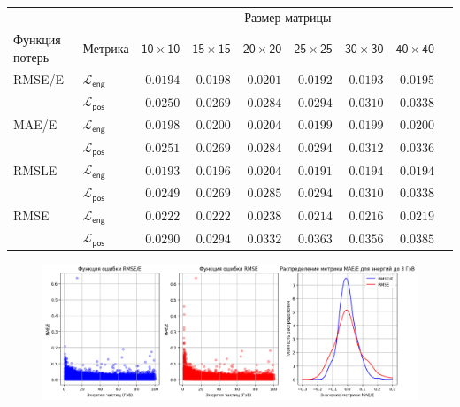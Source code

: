 \documentclass[a4paper,12pt]{extarticle}
\begin{document}
\begin{table}[ht]
	\footnotesize
	\centering
	\begin{tabular}{llrrrrrrr}
		\toprule
		{} & {} & \multicolumn{6}{c}{\textsf{Размер матрицы}} \\
		\cmidrule(lr){3-8}
		\textsf{Функция потерь} & \textsf{Метрика} & $\mathsf{10 \times 10}$ &  $\mathsf{15 \times 15}$ &  $\mathsf{20 \times 20}$ &  $\mathsf{25 \times 25}$ &  $\mathsf{30 \times 30}$ &  $\mathsf{40 \times 40}$ \\
		\midrule
        \textsf{RMSE/E} & $\mathcal{L}_{\mathsf{eng}}$ & $\mathsf{0.0194}$ & $\mathsf{0.0198}$ & $\mathsf{0.0201}$ & $\mathsf{0.0192}$ & $\mathsf{0.0193}$ & $\mathsf{0.0195}$ \\
        {} & $\mathcal{L}_{\mathsf{pos}}$ & $\mathsf{0.0250}$ & $\mathsf{0.0269}$ & $\mathsf{0.0284}$ & $\mathsf{0.0294}$ & $\mathsf{0.0310}$ & $\mathsf{0.0338}$ \\
        \midrule
        \textsf{MAE/E} & $\mathcal{L}_{\mathsf{eng}}$ & $\mathsf{0.0198}$ & $\mathsf{0.0200}$ & $\mathsf{0.0204}$ & $\mathsf{0.0199}$ & $\mathsf{0.0199}$ & $\mathsf{0.0200}$ \\
        {} & $\mathcal{L}_{\mathsf{pos}}$ & $\mathsf{0.0251}$ & $\mathsf{0.0269}$ & $\mathsf{0.0284}$ & $\mathsf{0.0294}$ & $\mathsf{0.0312}$ & $\mathsf{0.0336}$ \\
        \midrule
        \textsf{RMSLE} & $\mathcal{L}_{\mathsf{eng}}$ & $\mathsf{0.0193}$ & $\mathsf{0.0196}$ & $\mathsf{0.0204}$ & $\mathsf{0.0191}$ & $\mathsf{0.0194}$ & $\mathsf{0.0194}$ \\
        {} & $\mathcal{L}_{\mathsf{pos}}$ & $\mathsf{0.0249}$ & $\mathsf{0.0269}$ & $\mathsf{0.0285}$ & $\mathsf{0.0294}$ & $\mathsf{0.0310}$ & $\mathsf{0.0338}$ \\
        \midrule
        \textsf{RMSE} & $\mathcal{L}_{\mathsf{eng}}$ & $\mathsf{0.0222}$ & $\mathsf{0.0222}$ & $\mathsf{0.0238}$ & $\mathsf{0.0214}$ & $\mathsf{0.0216}$ & $\mathsf{0.0219}$ \\
        {} & $\mathcal{L}_{\mathsf{pos}}$ & $\mathsf{0.0290}$ & $\mathsf{0.0294}$ & $\mathsf{0.0332}$ & $\mathsf{0.0363}$ & $\mathsf{0.0356}$ & $\mathsf{0.0385}$ \\
		\bottomrule
	\end{tabular}
    \caption{}
	\label{table:loss_comp}
\end{table}

\begin{figure}[ht]
    \centering
    \includegraphics[width=1.0\textwidth]{graphics/exp2_distr_comp.png}
    \caption{}
    \label{graph:loss_distr}
\end{figure}
\end{document}
